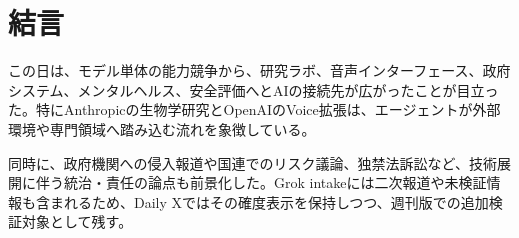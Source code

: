 \section*{結言}
この日は、モデル単体の能力競争から、研究ラボ、音声インターフェース、政府システム、メンタルヘルス、安全評価へとAIの接続先が広がったことが目立った。特にAnthropicの生物学研究とOpenAIのVoice拡張は、エージェントが外部環境や専門領域へ踏み込む流れを象徴している。

同時に、政府機関への侵入報道や国連でのリスク議論、独禁法訴訟など、技術展開に伴う統治・責任の論点も前景化した。Grok intakeには二次報道や未検証情報も含まれるため、Daily Xではその確度表示を保持しつつ、週刊版での追加検証対象として残す。
